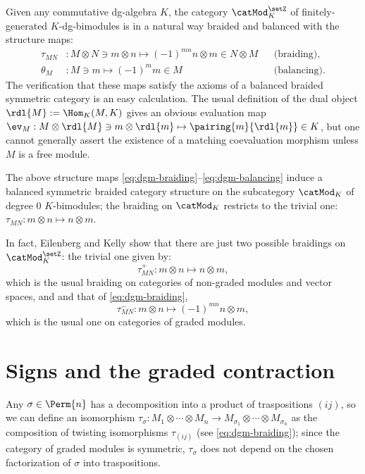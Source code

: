Given any commutative dg-algebra $K$, the category $\catMod_K^\setZ$ of
finitely-generated $K$-dg-bimodules is in a natural way braided and
balanced with the structure maps:
\begin{align}
  \label{eq:dgm-braiding}
  \tau_{MN} &: M \otimes N \ni m\otimes n \mapsto (-1)^{mn}n\otimes m \in N \otimes M
  &&
  \text{(braiding),}
  \\
  \label{eq:dgm-balancing}
  \theta_M &: M \ni m \mapsto (-1)^mm \in M
  &&
  \text{(balancing).}
\end{align}
The verification that these maps satisfy the axioms of a balanced
braided symmetric category is an easy calculation.  The usual
definition of the dual object $\rdl{M} := \Hom_K(M, K)$ gives an
obvious evaluation map $\ev_M : M \otimes \rdl{M} \ni m \otimes \rdl{m} \mapsto
\pairing{m}{\rdl{m}} \in K$, but one cannot generally assert the
existence of a matching coevaluation morphism unless $M$ is a free
module.

The above structure maps
\eqref{eq:dgm-braiding}--\eqref{eq:dgm-balancing} induce a balanced
symmetric braided category structure on the subcategory $\catMod_K$ of
degree $0$ $K$-bimodules; the braiding on $\catMod_K$ restricts to the
trivial one: $\tau_{MN}: m\otimes n \mapsto n\otimes m$.
\begin{remark}
  In fact, Eilenberg and Kelly \cite{eilenberg-kelly;closed-categories}
  show that there are just two possible braidings on $\catMod_K^\setZ$:
  the trivial one given by:
  \begin{equation*}
    \tau_{MN}^+ : m\otimes n \mapsto n\otimes m,
  \end{equation*}
  which is the usual braiding on categories of non-graded modules and
  vector spaces, and and that of \eqref{eq:dgm-braiding},
  \begin{equation*}
    \tau_{MN}^- : m\otimes n \mapsto (-1)^{mn} n\otimes m,
  \end{equation*}
  which is the usual one on categories of graded modules.
\end{remark}


\section{Signs and the graded contraction}
\label{sec:signs}

Any $\sigma\in\Perm{n}$ has a decomposition into a product of traspositions
$(ij)$, so we can define an isomorphism $\tau_\sigma: M_1 \otimes \cdots \otimes M_n \to M_{\sigma_1}
\otimes \cdots \otimes M_{\sigma_n}$ as the composition of twisting isomorphisms $\tau_{(ij)}$
(see \eqref{eq:dgm-braiding}); since the category of graded modules is
symmetric, $\tau_\sigma$ does not depend on the chosen factorization of $\sigma$
into traspositions.

